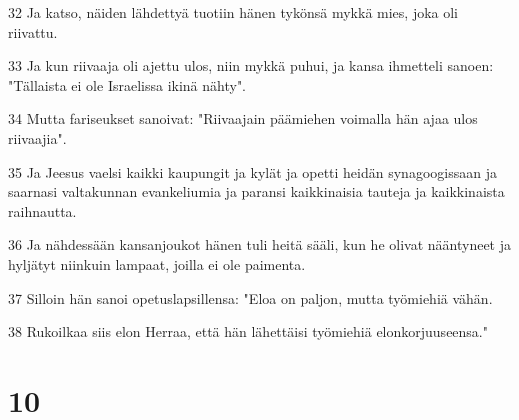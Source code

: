 \par 32 Ja katso, näiden lähdettyä tuotiin hänen tykönsä mykkä mies, joka oli riivattu.
\par 33 Ja kun riivaaja oli ajettu ulos, niin mykkä puhui, ja kansa ihmetteli sanoen: "Tällaista ei ole Israelissa ikinä nähty".
\par 34 Mutta fariseukset sanoivat: "Riivaajain päämiehen voimalla hän ajaa ulos riivaajia".
\par 35 Ja Jeesus vaelsi kaikki kaupungit ja kylät ja opetti heidän synagoogissaan ja saarnasi valtakunnan evankeliumia ja paransi kaikkinaisia tauteja ja kaikkinaista raihnautta.
\par 36 Ja nähdessään kansanjoukot hänen tuli heitä sääli, kun he olivat nääntyneet ja hyljätyt niinkuin lampaat, joilla ei ole paimenta.
\par 37 Silloin hän sanoi opetuslapsillensa: "Eloa on paljon, mutta työmiehiä vähän.
\par 38 Rukoilkaa siis elon Herraa, että hän lähettäisi työmiehiä elonkorjuuseensa."

\chapter{10}

